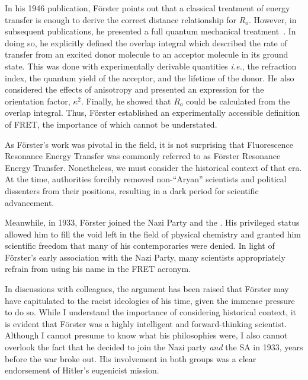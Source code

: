 In his 1946 publication, F{\"o}rster points out that a classical treatment of energy transfer is enough to derive the correct distance relationship for $R_o$. 
However, in subsequent publications, he presented a full quantum mechanical treatment~\cite{clegg_history}. 
In doing so, he explicitly defined the overlap integral which described the rate of transfer from an excited donor molecule to an acceptor molecule in its ground state. 
This was done with experimentally derivable quantities \textit{i.e.}, the refraction index, the quantum yield of the acceptor, and the lifetime of the donor. 
He also considered the effects of anisotropy and presented an expression for the orientation factor, $\kappa^2$. 
Finally, he showed that $R_o$ could be calculated from the overlap integral. 
Thus, F{\"o}rster established an experimentally accessible definition of FRET, the importance of which cannot be understated. 

As F{\"o}rster's work was pivotal in the field, it is not surprising that Fluorescence Resonance Energy Transfer was commonly referred to as F{\"o}rster Resonance Energy Transfer. 
Nonetheless, we must consider the historical context of that era. 
At the time, authorities forcibly removed non-\enquote{Aryan} scientists and political dissenters from their positions, resulting in a dark period for scientific advancement.

Meanwhile, in 1933, F{\"o}rster joined the Nazi Party and the .
His privileged status allowed him to fill the void left in the field of physical chemistry and granted him scientific freedom that many of his contemporaries were denied. 
In light of F{\"o}rster's early association with the Nazi Party, many scientists appropriately refrain from using his name in the FRET acronym.


\newpage

In discussions with colleagues, the argument has been raised that F{\"o}rster may have capitulated to the racist ideologies of his time, given the immense pressure to do so. 
While I understand the importance of considering historical context, it is evident that F{\"o}rster was a highly intelligent and forward-thinking scientist. Although I cannot presume to know what his philosophies were,
I also cannot overlook the fact that he decided to join the Nazi party \textit{and} the SA in 1933, years before the war broke out.
His involvement in both groups was a clear endorsement of Hitler's eugenicist mission.

